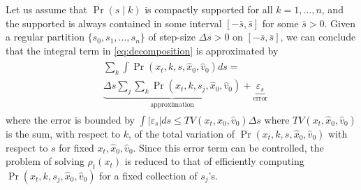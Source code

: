 \documentclass[letterpaper,10pt,conference]{ieeetran}
\begin{document}
Let us assume that $\Pr(s \mid k)$ is compactly supported for all $k = 1,\dots,n$, and the supported is always contained
in some interval $[ - \bar{s} , \bar{s} ]$ for some $\bar{s} > 0$.
Given a regular partition $\{ s_0, s_1, \dots, s_n \}$ of step-size $\Delta s > 0$ on $[-\bar{s}, \bar{s}]$,  we can conclude that the integral term in \eqref{eq:decomposition} is approximated by
\begin{align}
	\begin{split}
	&\sum_{k} \int \Pr( x_t, k , s , \hat{x}_0, \hat{v}_0 ) ds = \\
	 &\underbrace{\Delta s \sum_{j} \sum_{k} \Pr( x_t, k , s_j , \hat{x}_0, \hat{v}_0)}_{\text{approximation}}
	  +
	  \underbrace{\varepsilon_s}_{\text{error}}
	 \end{split} \label{eq:approximation 0}
\end{align}
where the error is bounded by $\int| \varepsilon_s | ds \leq  TV(x_t, \hat{x}_0, \hat{v}_0) \Delta s$
where $TV(x_t, \hat{x}_0, \hat{v}_0)$ is the sum, with respect to $k$, of the total variation of $\Pr( x_t, k , s, \hat{x}_0, \hat{v}_0 )$ with respect to $s$ for fixed $x_t, \hat{x}_0, \hat{v}_0$.
Since this error term can be controlled, the problem of solving $\rho_t(x_t)$ is reduced to that of efficiently computing $ \Pr( x_t, k , s_j, \hat{x}_0, \hat{v}_0)$
for a fixed collection of $s_j$'s.
\end{document}
